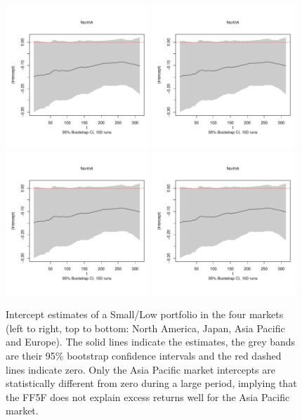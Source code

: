 \begin{figure}[!ht]
\centering
\includegraphics[page = 1, width = 0.48\textwidth]{Fig1}
\includegraphics[page = 2, width = 0.48\textwidth]{Fig1}
\includegraphics[page = 3, width = 0.48\textwidth]{Fig1}
\includegraphics[page = 4, width = 0.48\textwidth]{Fig1}
\caption{Intercept estimates of a Small/Low portfolio in the four markets (left to right, top to bottom: North America, Japan, Asia Pacific and Europe). The solid lines indicate the estimates, the grey bands are their 95\% bootstrap confidence intervals and the red dashed lines indicate zero. Only the Asia Pacific market intercepts are statistically different from zero during a large period, implying that the FF5F does not explain excess returns well for the Asia Pacific market. \label{fig:tvff5f}}
\end{figure}

